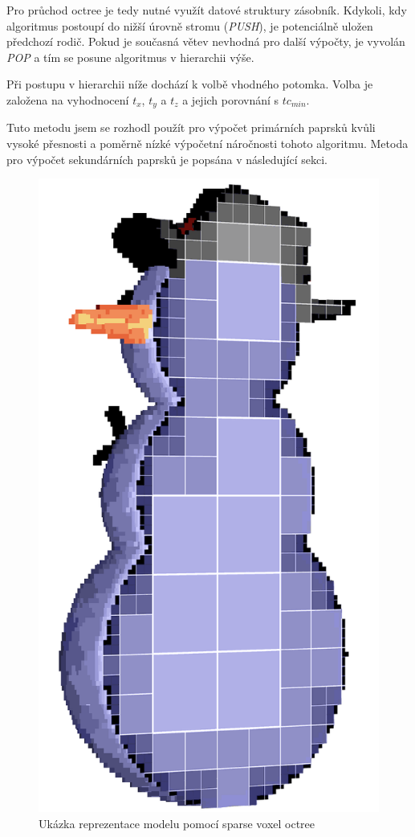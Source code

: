 Pro průchod octree je tedy nutné využít datové struktury zásobník. Kdykoli, kdy algoritmus postoupí do nižší úrovně stromu (\textit{PUSH}), je potenciálně uložen předchozí rodič. Pokud je současná větev nevhodná pro další výpočty, je vyvolán \textit{POP} a tím se posune algoritmus v hierarchii výše. 

Při postupu v hierarchii níže dochází k volbě vhodného potomka. Volba je založena na vyhodnocení $t_x$, $t_y$ a $t_z$ a jejich porovnání s $tc_{min}$.

Tuto metodu jsem se rozhodl použít pro výpočet primárních paprsků kvůli vysoké přesnosti a poměrně nízké výpočetní náročnosti tohoto algoritmu. Metoda pro výpočet sekundárních paprsků je popsána v následující sekci.

\begin{figure}[H]
	\centering
	\includegraphics[scale=0.2]{obrazky-figures/svo_snowman.png}
	\caption{Ukázka reprezentace modelu pomocí sparse voxel octree}
	\label{fig:svo_example}
\end{figure}

